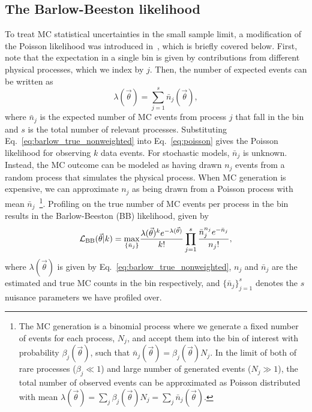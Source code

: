 \documentclass[a4paper, 11pt]{article}
\newcommand{\like}{\mathcal{L}}
\newcommand{\vectheta}{\vec{\theta}}
\newcommand{\lbarlow}{\like_{\textmd{BB}}}
\begin{document}
\subsection{The Barlow-Beeston likelihood}
To treat MC statistical uncertainties in the small sample limit, a modification of the Poisson likelihood was introduced in~\cite{Barlow:1993dm}, which is briefly covered below. First, note that the expectation in a single bin is given by contributions from different physical processes, which we index by $j$. Then, the number of expected events can be written as
\begin{equation}
\lambda(\vectheta) = \sum_{j=1}^s \bar n_{j}(\vectheta),
\label{eq:barlow_true_nonweighted}
\end{equation}
where $\bar n_{j}$ is the expected number of MC events from process $j$ that fall in the bin and $s$ is the total number of relevant processes. Substituting Eq.~\eqref{eq:barlow_true_nonweighted} into Eq.~\eqref{eq:poisson} gives the Poisson likelihood for observing $k$ data events. For stochastic models, $\bar n_j$ is unknown. Instead, the MC outcome can be modeled as having drawn $n_j$ events from a random process that simulates the physical process. When MC generation is expensive, we can approximate $n_j$ as being drawn from a Poisson process with mean $\bar{n}_j$~\footnote{The MC generation is a binomial process where we generate a fixed number of events for each process, $N_j$, and accept them into the bin of interest with probability $\beta_{j}(\vectheta)$, such that $\bar n_{j}(\vectheta)=\beta_{j}(\vectheta) N_j$. In the limit of both of rare processes ($\beta_{j} \ll 1$) and large number of generated events ($N_j \gg 1$), the total number of observed events can be approximated as Poisson distributed with mean $\lambda(\vectheta) = \sum_j\beta_{j}(\vectheta) N_j = \sum_j\bar n_{j}(\vectheta)$.}. Profiling on the true number of MC events per process in the bin results in the Barlow-Beeston (BB) likelihood, given by~\cite{Barlow:1993dm}
\begin{equation}
\lbarlow(\vectheta|k) = \underset{\{\bar n_j\}}{\rm max}
\frac{\lambda(\vectheta)^{k}e^{-\lambda(\vectheta)}}{k!} \prod_{j=1}^s \frac{\bar n_j^{n_j}e^{-\bar n_j}}{n_j!},
\label{eq:barlow_likelihood_nonweighted}
\end{equation}
where $\lambda(\vectheta)$ is given by Eq.~\eqref{eq:barlow_true_nonweighted}, $n_{j}$ and $\bar{n}_{j}$ are the estimated and true MC counts in the bin respectively, and $\{\bar{n}_j\}_{j=1}^{s}$ denotes the $s$ nuisance parameters we have profiled over.
\end{document}
